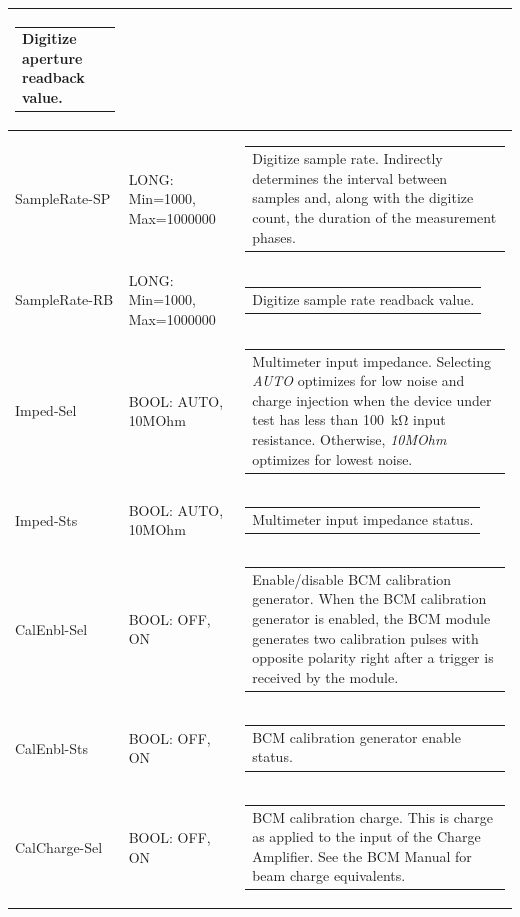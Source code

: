 \documentclass[openany]{article}
\begin{document}
\begin{longtable}{| m{3.0cm} m{4.5cm} m{7.0cm} |}
\begin{tabular}{@{}m{6cm}@{}}
	    					Digitize aperture readback value.
						\end{tabular} \\ \hline
		SampleRate-SP & LONG: Min=1000, Max=1000000 & \begin{tabular}{@{}m{6cm}@{}}
	    					Digitize sample rate. Indirectly determines the interval between samples and, along with the digitize count, the duration of the measurement phases.
						\end{tabular} \\ \hline
		SampleRate-RB & LONG: Min=1000, Max=1000000 & \begin{tabular}{@{}m{6cm}@{}}
	    					Digitize sample rate readback value.
						\end{tabular} \\ \hline
		Imped-Sel & BOOL: AUTO, 10MOhm & \begin{tabular}{@{}m{6cm}@{}}
	    					Multimeter input impedance. Selecting \emph{AUTO} optimizes for low noise and charge injection when the device under test has less than \SI{100}{\kohm} input resistance. Otherwise, \emph{10MOhm} optimizes for lowest noise.
						\end{tabular} \\ \hline
		Imped-Sts & BOOL: AUTO, 10MOhm & \begin{tabular}{@{}m{6cm}@{}}
	    					Multimeter input impedance status.
						\end{tabular} \\ \hline
		CalEnbl-Sel & BOOL: OFF, ON & \begin{tabular}{@{}m{6cm}@{}}
	    					Enable/disable BCM calibration generator. When the BCM calibration generator is enabled, the BCM module generates two calibration pulses with opposite polarity right after a trigger is received by the module.
						\end{tabular} \\ \hline
		CalEnbl-Sts & BOOL: OFF, ON & \begin{tabular}{@{}m{6cm}@{}}
 						BCM calibration generator enable status.
						\end{tabular} \\ \hline
		CalCharge-Sel & BOOL: OFF, ON & \begin{tabular}{@{}m{6cm}@{}}
	    					BCM calibration charge. This is charge as applied to the input of the Charge Amplifier. See the BCM Manual for beam charge equivalents.
						\end{tabular} \\ \hline

\end{longtable}
\end{document}
